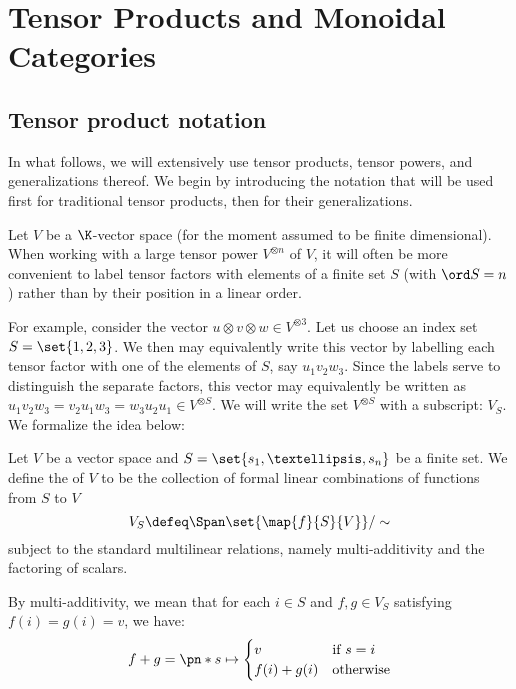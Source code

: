 \chapter{Tensor Products and Monoidal Categories}
\label{ch:intro}

\section{Tensor product notation}
In what follows, we will extensively use tensor products, tensor powers, and
generalizations thereof. We begin by introducing the notation that will be used
first for traditional tensor products, then for their generalizations.

Let $V$ be a $\K$-vector space (for the moment assumed to be finite
dimensional). When working with a large tensor power $V^{\otimes n}$ of $V$, it
will often be more convenient to label tensor factors with elements of a finite
set $S$ (with $\ord S = n$) rather than by their position in a linear order.

For example, consider the vector $u \otimes v \otimes w \in V^{\otimes 3}$. Let
us choose an index set $S = \set{1,2,3}$. We then may equivalently write this
vector by labelling each tensor factor with one of the elements of $S$, say
$u_1v_2w_3$. Since the labels serve to distinguish the separate factors, this
vector may equivalently be written as $u_1v_2w_3 = v_2u_1w_3 = w_3u_2u_1 \in
V^{\otimes S}$. We will write the set $V^{\otimes S}$ with a subscript: $V_S$.
We formalize the idea below:

\begin{definition}
        Let $V$ be a vector space and $S = \set{s_1,…, s_n}$ be a finite
        set. We define the  of $V$ to be the
        collection of formal linear combinations of functions from $S$ to $V$
        \begin{equation}\label{eq:indexed_tensor}
                V_S \defeq \Span\set{\map {f} {S} {V}}/\sim
        \end{equation}
        subject to the standard multilinear relations, namely multi-additivity
        and the factoring of scalars.

        By multi-additivity, we mean that for each $i\in S$ and $f, g \in V_S$ satisfying
        $f(i) = g(i) = v$, we have:
        \begin{equation}
                \label{eq:tensor_additive}
                f + g = \pn*{
                        s \mapsto \begin{cases}
                                v & \text{if $s = i$}\\
                                f(i) + g(i) & \text{otherwise}
                        \end{cases}
                }
        \end{equation}
\end{definition}

